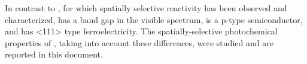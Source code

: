 In contrast to , for which spatially selective reactivity has been observed and
characterized,  has a band gap in the visible spectrum, is a p-type
semiconductor, and has <111> type ferroelectricity. The spatially-selective photochemical
properties of , taking into account these differences, were studied and are
reported in this document.

